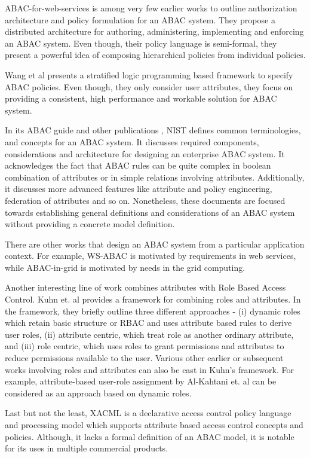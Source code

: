 ABAC-for-web-services \cite{abac-for-web-service} is among very few earlier works to outline authorization architecture and policy formulation for an ABAC system. They propose a distributed architecture for authoring, administering, implementing and enforcing an ABAC system. Even though, their policy language is semi-formal, they present a powerful idea of composing hierarchical policies from individual policies.

Wang et al \cite{wang2004logic} presents a stratified logic programming based framework to specify ABAC policies. Even though, they only consider user attributes, they focus on providing a consistent, high performance and workable solution for ABAC system.



In its ABAC guide \cite{nist-abac-draft} and other publications \cite{hu2015attribute},  NIST defines common terminologies, and concepts for an ABAC system. It discusses required components, considerations and architecture for designing an  enterprise ABAC system. It acknowledges the fact that ABAC rules can be quite complex in boolean combination of attributes or in simple relations involving attributes. Additionally, it discusses more advanced features like attribute and policy engineering, federation of attributes and so on. Nonetheless, these documents are focused towards establishing general definitions and considerations of an ABAC system without providing a concrete model definition.

There are other works that design an ABAC system from a particular application context. For example, WS-ABAC \cite{abac-ws}  is motivated by requirements in web services, while ABAC-in-grid \cite{grid-abac}  is motivated by needs in the grid computing.



Another interesting line of work combines attributes with Role Based Access Control. Kuhn et. al \cite{kuhn2010adding} provides a framework for combining roles and attributes. In the framework, they briefly outline three different approaches - (i) dynamic roles which retain basic structure or RBAC and  uses attribute based rules to derive user roles, (ii) attribute centric,  which treat role as another ordinary attribute, and (iii) role centric, which uses roles to grant permissions and attributes to reduce permissions available to the user. Various other earlier or subsequent works involving roles and attributes can also be cast in Kuhn's framework. For example, attribute-based user-role assignment by Al-Kahtani et. al \cite{al2002model} can be considered as an approach based on dynamic roles.

Last but not the least, XACML \cite{xacml} is a declarative access control policy language and processing model which  supports attribute based access control concepts and policies. Although, it lacks a formal definition of an ABAC model, it is notable for its uses in multiple commercial products.